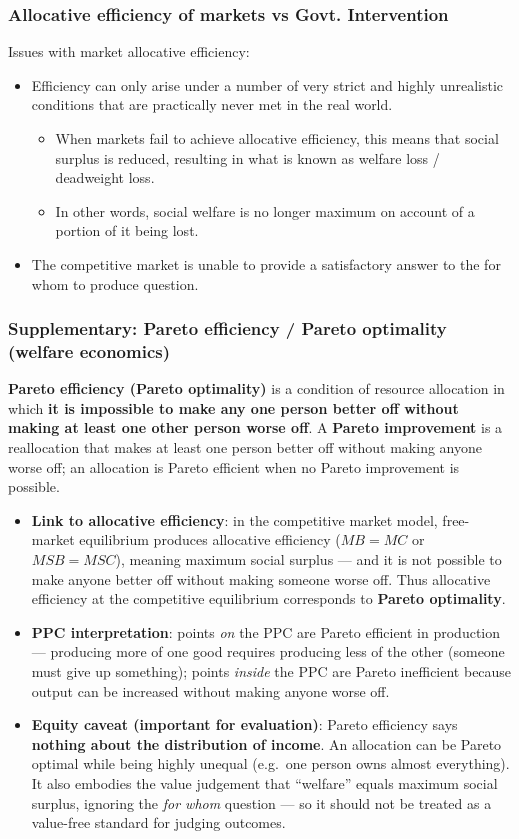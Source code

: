 \documentclass[a4paper,12pt]{article}
\newcommand{\needbold}[1]{\textcolor{red!70!black}{\textbf{#1}}}
\begin{document}
\subsubsection*{Allocative efficiency of markets vs Govt. Intervention}
Issues with market allocative efficiency:
\begin{itemize}
  \item Efficiency can only arise under a number of very strict and highly unrealistic conditions that are practically never met in the real world.
  \begin{itemize}
    \item When markets fail to achieve allocative efficiency, this means that social surplus is reduced, resulting in what is known as welfare loss / deadweight loss.
    \item In other words, social welfare is no longer maximum on account of a portion of it being lost.
  \end{itemize}
  \item The competitive market is unable to provide a satisfactory answer to the for whom to produce question.
\end{itemize}
\subsubsection*{Supplementary: Pareto efficiency / Pareto optimality (welfare economics)}
\needbold{Pareto efficiency (Pareto optimality)} is a condition of resource allocation in which \textbf{it is impossible to make any one person better off without making at least one other person worse off}. A \needbold{Pareto improvement} is a reallocation that makes at least one person better off without making anyone worse off; an allocation is Pareto efficient when no Pareto improvement is possible.
\begin{itemize}
  \item \textbf{Link to allocative efficiency}: in the competitive market model, free-market equilibrium produces allocative efficiency ($MB = MC$ or $MSB = MSC$), meaning maximum social surplus --- and it is not possible to make anyone better off without making someone worse off. Thus allocative efficiency at the competitive equilibrium corresponds to \textbf{Pareto optimality}.
  \item \textbf{PPC interpretation}: points \textit{on} the PPC are Pareto efficient in production --- producing more of one good requires producing less of the other (someone must give up something); points \textit{inside} the PPC are Pareto inefficient because output can be increased without making anyone worse off.
  \item \textbf{Equity caveat (important for evaluation)}: Pareto efficiency says \textbf{nothing about the distribution of income}. An allocation can be Pareto optimal while being highly unequal (e.g.\ one person owns almost everything). It also embodies the value judgement that ``welfare'' equals maximum social surplus, ignoring the \textit{for whom} question --- so it should not be treated as a value-free standard for judging outcomes.
\end{itemize}
\end{document}
